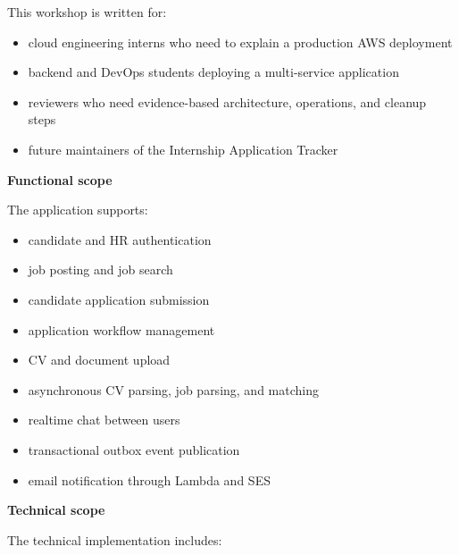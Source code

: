 This workshop is written for:

\begin{itemize}
\tightlist
\item
  cloud engineering interns who need to explain a production AWS
  deployment
\item
  backend and DevOps students deploying a multi-service application
\item
  reviewers who need evidence-based architecture, operations, and
  cleanup steps
\item
  future maintainers of the Internship Application Tracker
\end{itemize}

\vspace{0.5em}\noindent\textbf{Functional scope}\par

The application supports:

\begin{itemize}
\tightlist
\item
  candidate and HR authentication
\item
  job posting and job search
\item
  candidate application submission
\item
  application workflow management
\item
  CV and document upload
\item
  asynchronous CV parsing, job parsing, and matching
\item
  realtime chat between users
\item
  transactional outbox event publication
\item
  email notification through Lambda and SES
\end{itemize}

\vspace{0.5em}\noindent\textbf{Technical scope}\par

The technical implementation includes:

